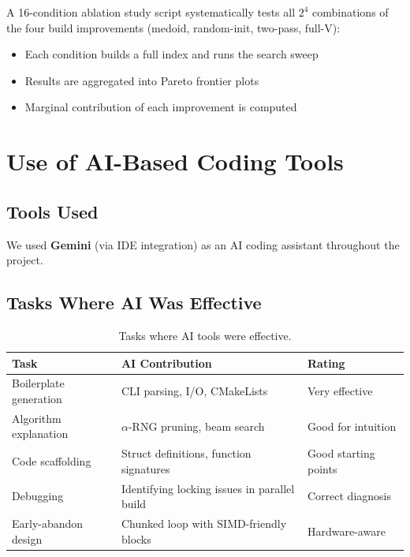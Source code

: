 \documentclass[10pt]{article}
\begin{document}
A 16-condition ablation study script systematically tests all $2^4$ combinations of the four build improvements (medoid, random-init, two-pass, full-V):
\begin{itemize}
    \item Each condition builds a full index and runs the search sweep
    \item Results are aggregated into Pareto frontier plots
    \item Marginal contribution of each improvement is computed
\end{itemize}

\section{Use of AI-Based Coding Tools}

\subsection{Tools Used}

We used \textbf{Gemini} (via IDE integration) as an AI coding assistant throughout the project.

\subsection{Tasks Where AI Was Effective}

\begin{table}[H]
\centering
\small
\begin{tabular}{lll}
\toprule
\textbf{Task} & \textbf{AI Contribution} & \textbf{Rating} \\
\midrule
Boilerplate generation & CLI parsing, I/O, CMakeLists & Very effective \\
Algorithm explanation & $\alpha$-RNG pruning, beam search & Good for intuition \\
Code scaffolding & Struct definitions, function signatures & Good starting points \\
Debugging & Identifying locking issues in parallel build & Correct diagnosis \\
Early-abandon design & Chunked loop with SIMD-friendly blocks & Hardware-aware \\
\bottomrule
\end{tabular}
\caption{Tasks where AI tools were effective.}
\label{tab:ai_effective}
\end{table}
\end{document}
